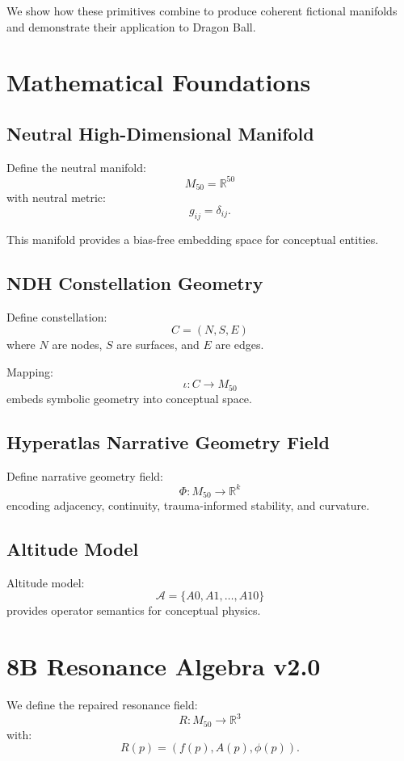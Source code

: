 \documentclass[11pt]{article}
\begin{document}
We show how these primitives combine to produce coherent fictional 
manifolds and demonstrate their application to Dragon Ball.

\section{Mathematical Foundations}

\subsection{Neutral High-Dimensional Manifold}

Define the neutral manifold:
\[
M_{50} = \mathbb{R}^{50}
\]
with neutral metric:
\[
g_{ij} = \delta_{ij}.
\]

This manifold provides a bias-free embedding space for conceptual entities.

\subsection{NDH Constellation Geometry}

Define constellation:
\[
C = (N, S, E)
\]
where $N$ are nodes, $S$ are surfaces, and $E$ are edges.

Mapping:
\[
\iota : C \to M_{50}
\]
embeds symbolic geometry into conceptual space.

\subsection{Hyperatlas Narrative Geometry Field}

Define narrative geometry field:
\[
\Phi : M_{50} \to \mathbb{R}^k
\]
encoding adjacency, continuity, trauma-informed stability, and curvature.

\subsection{Altitude Model}

Altitude model:
\[
\mathcal{A} = \{A0, A1, \dots, A10\}
\]
provides operator semantics for conceptual physics.

\section{8B Resonance Algebra v2.0}

We define the repaired resonance field:
\[
R : M_{50} \to \mathbb{R}^3
\]
with:
\[
R(p) = (f(p), A(p), \phi(p)).
\]
\end{document}
